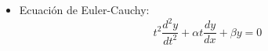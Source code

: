 \documentclass[twoside, twocolumn, 10pt]{article}
\begin{document}
{\begin{small}
\begin{enumerate}
\begin{itemize}
    Solución General:
    \begin{equation}
    y = c_{1} e^{r_{1}t} + c_{2} t e^{r_{2}t}
    \end{equation}
    
    Reducción de Orden: Hallar un método para encontrar soluciones que formen un $CF$
    \begin{equation}
    a_{2}(t)
     
    \end{equation}


    
    \item Ecuación de Euler-Cauchy:
    \begin{equation}
    t^{2}\frac{d^{2}y}{dt^{2}}+\alpha t\frac{dy}{dx} + \beta y = 0 
    \end{equation}

% 
% 
% 
% 


\end{itemize} 
\end{enumerate}
%
%
 \vspace{.1cm} 
\end{small}}
\end{document}

